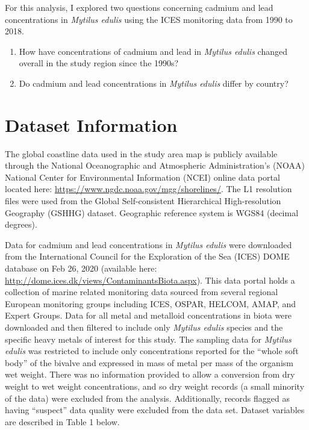 \documentclass[
  12pt,
]{article}
\providecommand{\tightlist}{%
  \setlength{\itemsep}{0pt}\setlength{\parskip}{0pt}}
\begin{document}
For this analysis, I explored two questions concerning cadmium and lead
concentrations in \emph{Mytilus edulis} using the ICES monitoring data
from 1990 to 2018.

\begin{enumerate}
\def\labelenumi{\arabic{enumi}.}
\tightlist
\item
  How have concentrations of cadmium and lead in \emph{Mytilus edulis}
  changed overall in the study region since the 1990s?
\item
  Do cadmium and lead concentrations in \emph{Mytilus edulis} differ by
  country?
\end{enumerate}

\newpage

\hypertarget{dataset-information}{%
\section{Dataset Information}\label{dataset-information}}

The global coastline data used in the study area map is publicly
available through the National Oceanographic and Atmospheric
Administration's (NOAA) National Center for Environmental Information
(NCEI) online data portal located here:
\url{https://www.ngdc.noaa.gov/mgg/shorelines/}. The L1 resolution files
were used from the Global Self-consistent Hierarchical High-resolution
Geography (GSHHG) dataset. Geographic reference system is WGS84 (decimal
degrees).

Data for cadmium and lead concentrations in \emph{Mytilus edulis} were
downloaded from the International Council for the Exploration of the Sea
(ICES) DOME database on Feb 26, 2020 (available here:
\url{http://dome.ices.dk/views/ContaminantsBiota.aspx}). This data
portal holds a collection of marine related monitoring data sourced from
several regional European monitoring groups including ICES, OSPAR,
HELCOM, AMAP, and Expert Groups. Data for all metal and metalloid
concentrations in biota were downloaded and then filtered to include
only \emph{Mytilus edulis} species and the specific heavy metals of
interest for this study. The sampling data for \emph{Mytilus edulis} was
restricted to include only concentrations reported for the ``whole soft
body'' of the bivalve and expressed in mass of metal per mass of the
organism wet weight. There was no information provided to allow a
conversion from dry weight to wet weight concentrations, and so dry
weight records (a small minority of the data) were excluded from the
analysis. Additionally, records flagged as having ``suspect'' data
quality were excluded from the data set. Dataset variables are described
in Table 1 below.
\end{document}
